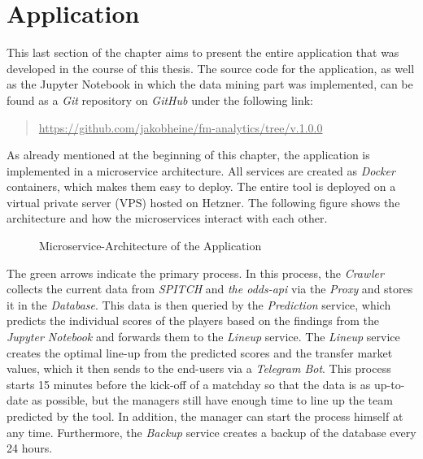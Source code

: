 \clearpage \section{Application}

This last section of the chapter aims to present the entire application that was developed in the course of this thesis. The source code for the application, as well as the Jupyter Notebook in which the data mining part was implemented, can be found as a \emph{Git} repository on \emph{GitHub} under the following link:

\begin{quote}
    \centering
    \underline{https://github.com/jakobheine/fm-analytics/tree/v.1.0.0}
\end{quote}

As already mentioned at the beginning of this chapter, the application is implemented in a microservice architecture. All services are created as \emph{Docker} containers, which makes them easy to deploy. The entire tool is deployed on a virtual private server (VPS) hosted on Hetzner.\parencite[][]{hetzner_about_2021} The following figure shows the architecture and how the microservices interact with each other.

\begin{figure}[H]
    \centering
    \captionsetup{justification=centering}
    \caption{Microservice-Architecture of the Application}
    \label{fig:microservice-architecture}
\end{figure}

The green arrows indicate the primary process. In this process, the \emph{Crawler} collects the current data from \emph{SPITCH} and \emph{the odds-api} via the \emph{Proxy} and stores it in the \emph{Database}. This data is then queried by the \emph{Prediction} service, which predicts the individual scores of the players based on the findings from the \emph{Jupyter Notebook} and forwards them to the \emph{Lineup} service. The \emph{Lineup} service creates the optimal line-up from the predicted scores and the transfer market values, which it then sends to the end-users via a \emph{Telegram Bot}. This process starts 15 minutes before the kick-off of a matchday so that the data is as up-to-date as possible, but the managers still have enough time to line up the team predicted by the tool. In addition, the manager can start the process himself at any time. Furthermore, the \emph{Backup} service creates a backup of the database every 24 hours.

